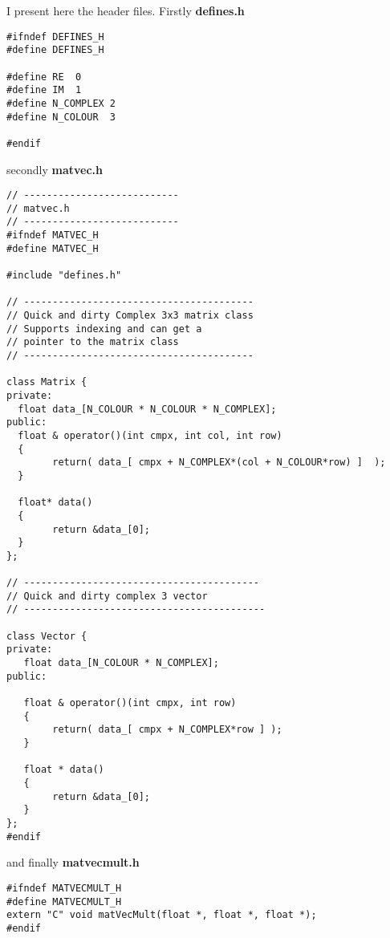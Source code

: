 I present here the header files. Firstly {\bf defines.h}
{\scriptsize
\begin{verbatim}
#ifndef DEFINES_H
#define DEFINES_H

#define RE  0
#define IM  1
#define N_COMPLEX 2
#define N_COLOUR  3

#endif
\end{verbatim}}
secondly {\bf matvec.h} 
{\scriptsize
\begin{verbatim}
// ---------------------------
// matvec.h
// ---------------------------
#ifndef MATVEC_H
#define MATVEC_H

#include "defines.h"

// ----------------------------------------
// Quick and dirty Complex 3x3 matrix class
// Supports indexing and can get a
// pointer to the matrix class
// ----------------------------------------

class Matrix {
private:
  float data_[N_COLOUR * N_COLOUR * N_COMPLEX];
public:
  float & operator()(int cmpx, int col, int row) 
  {
        return( data_[ cmpx + N_COMPLEX*(col + N_COLOUR*row) ]  );
  }

  float* data() 
  {
        return &data_[0]; 
  }
};

// -----------------------------------------
// Quick and dirty complex 3 vector
// ------------------------------------------

class Vector {
private:
   float data_[N_COLOUR * N_COMPLEX];
public: 

   float & operator()(int cmpx, int row) 
   {
        return( data_[ cmpx + N_COMPLEX*row ] );
   }
 
   float * data()
   { 
        return &data_[0];
   }
}; 
#endif
\end{verbatim}}
and finally {\bf matvecmult.h}
{\scriptsize
\begin{verbatim}
#ifndef MATVECMULT_H
#define MATVECMULT_H
extern "C" void matVecMult(float *, float *, float *);
#endif
\end{verbatim}}

